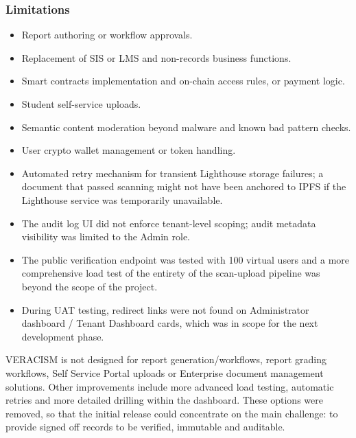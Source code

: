         \subsubsection{Limitations}
            \begin{itemize}
              \item Report authoring or workflow approvals.
              \item Replacement of SIS or LMS and non-records business functions.
              \item Smart contracts implementation and on-chain access rules, or payment logic.
              \item Student self-service uploads.
              \item Semantic content moderation beyond malware and known bad pattern checks.
              \item User crypto wallet management or token handling.
              \item Automated retry mechanism for transient Lighthouse storage failures; a document that passed scanning might not have been anchored to IPFS if the Lighthouse service was temporarily unavailable.
              \item The audit log UI did not enforce tenant-level scoping; audit metadata visibility was limited to the Admin role.
              \item The public verification endpoint was tested with 100 virtual users and a more comprehensive load test of the entirety of the scan-upload pipeline was beyond the scope of the project.
              \item During UAT testing, redirect links were not found on Administrator dashboard / Tenant Dashboard cards, which was in scope for the next development phase.
            \end{itemize}

VERACISM is not designed for report generation/workflows, report grading workflows, Self Service Portal uploads or Enterprise document management solutions. Other improvements include more advanced load testing, automatic retries and more detailed drilling within the dashboard. These options were removed, so that the initial release could concentrate on the main challenge: to provide signed off records to be verified, immutable and auditable.